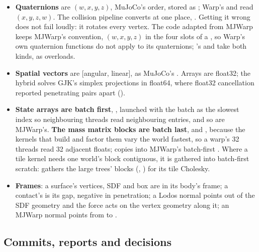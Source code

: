 \begin{itemize}
\item \textbf{Quaternions} are $(w, x, y, z)$, MuJoCo's order, stored as ; Warp's  and  read $(x, y, z, w)$. The collision pipeline converts at one place, . Getting it wrong does not fail loudly: it rotates every vertex. The code adapted from MJWarp keeps MJWarp's convention, $(w, x, y, z)$ in the four slots of a , so Warp's own quaternion functions do not apply to its quaternions; 's  and  take both kinds, as overloads.
\item \textbf{Spatial vectors} are [angular, linear], as MuJoCo's . Arrays are float32; the hybrid solves GJK's simplex projections in float64, where float32 cancellation reported penetrating pairs apart ().
\item \textbf{State arrays are batch first}, , launched with the batch as the slowest index so neighbouring threads read neighbouring entries, and so are MJWarp's. \textbf{The mass matrix blocks are batch last},  and  , because the kernels that build and factor them vary the world fastest, so a warp's 32 threads read 32 adjacent floats;  copies  into MJWarp's batch-first . Where a tile kernel needs one world's block contiguous, it is gathered into batch-first scratch:  gathers the large trees' blocks (, ) for its tile Cholesky.
\item \textbf{Frames}: a surface's vertices, SDF and box are in its body's frame; a contact's  is its gap, negative in penetration; a Lodos normal points out of the SDF geometry and the force acts on the vertex geometry along it; an MJWarp normal points from  to .
\end{itemize}

\subsection{Commits, reports and decisions}\label{sec:practice}

